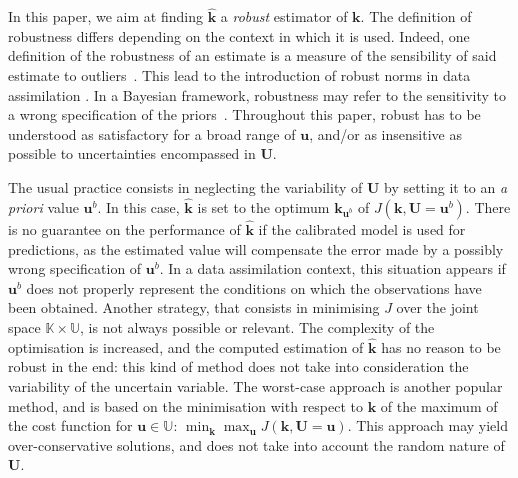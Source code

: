 \documentclass[preprint, 1p]{elsarticle}
\newcommand{\kest}{\hat{\mathbf{k}}}
\newcommand{\Kspace}{\mathbb{K}}
\newcommand{\Uspace}{\mathbb{U}}
\begin{document}
In this paper, we aim at finding $\kest$ a {\it robust} estimator of $\mathbf{k}$.
The definition of robustness differs depending on the context in which it is used. Indeed, one definition of the robustness of an estimate is a measure of the sensibility of said estimate to outliers~\citep{huber_robust_2011}. This lead to the introduction of robust norms in data assimilation \citep{rao_robust_2015}. %
In a Bayesian framework, robustness may refer to the sensitivity to a wrong specification of the priors~\citep{berger_overview_1994}.
%
Throughout this paper, 
robust has to be understood as satisfactory for a broad range of $\mathbf{u}$, and/or as insensitive as possible to uncertainties encompassed in $\mathbf{U}$.

The usual practice consists in neglecting the variability of $\mathbf{U}$ by setting it to an {\it a priori} value $\mathbf{u}^b$.
 In this case, $\kest$ is set to the optimum ${\mathbf{k}}_{\mathbf{u}^{b}} $ of $J(\mathbf{k}, \mathbf{U}=\mathbf{u}^b)$.  There is no guarantee on the performance of $\kest$ if the calibrated model is used for predictions, as the estimated value will compensate the error made by a possibly wrong specification of $\mathbf{u}^b$.
In a data assimilation context, this situation appears if $\mathbf{u}^b$ does not properly represent the conditions on which the observations have been obtained.
Another strategy, that consists in minimising $J$ over the joint space $\Kspace\times\Uspace$, is not always possible or relevant. The complexity of the optimisation is increased, and the computed estimation of $\kest$ has no reason to be robust in the end: this kind of method does not take into consideration the variability of the uncertain variable. 
%
The worst-case approach \citep{marzat_worst-case_2013} is another popular method, and is based on the minimisation with respect to $\mathbf{k}$ of the maximum of the cost function for $\mathbf{u}\in\Uspace$: $\min_{\mathbf{k}} \max_{\mathbf{u}} J(\mathbf{k}, \mathbf{U} = \mathbf{u})$. This approach may yield over-conservative solutions, and does not take into account the random nature of $\mathbf{U}$.%
\end{document}
